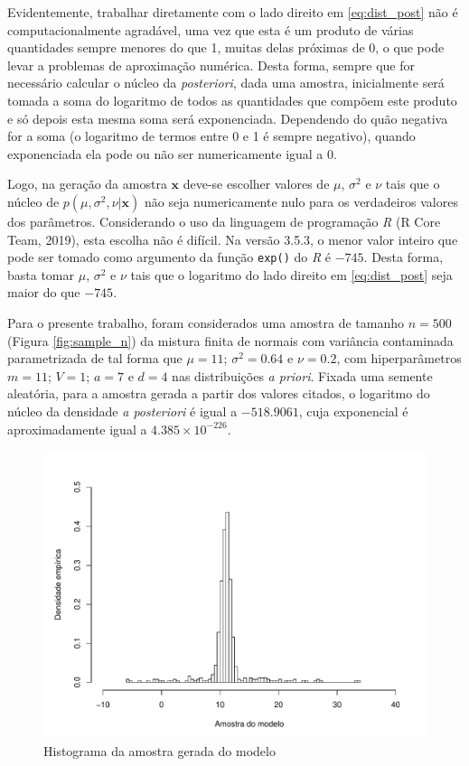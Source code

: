 Evidentemente, trabalhar diretamente com o lado direito em \eqref{eq:dist_post} não é computacionalmente agradável, uma vez que esta é um produto de várias quantidades sempre menores do que 1, muitas delas próximas de 0, o que pode levar a problemas de aproximação numérica. Desta forma, sempre que for necessário calcular o núcleo da \textit{posteriori}, dada uma amostra, inicialmente será tomada a soma do logaritmo de todos as quantidades que compõem este produto e só depois esta mesma soma será exponenciada. Dependendo do quão negativa for a soma (o logaritmo de termos entre 0 e 1 é sempre negativo), quando exponenciada ela pode ou não ser numericamente igual a 0.

Logo, na geração da amostra $\bm{x}$ deve-se escolher valores de $\mu$, $\sigma^2$ e $\nu$ tais que o núcleo de $p(\mu, \sigma^2, \nu | \bm{x})$ não seja numericamente nulo para os verdadeiros valores dos parâmetros. Considerando o uso da linguagem de programação \textit{R} (R Core Team, 2019)\cite{RCoreTeam2019}, esta escolha não é difícil. Na versão 3.5.3, o menor valor inteiro que pode ser tomado como argumento da função \verb|exp()| do \textit{R} é $-745$. Desta forma, basta tomar $\mu$, $\sigma^2$ e $\nu$ tais que o logaritmo do lado direito em \eqref{eq:dist_post} seja maior do que $-745$.

Para o presente trabalho, foram considerados uma amostra de tamanho $n=500$ (Figura \ref{fig:sample_n}) da mistura finita de normais com variância contaminada parametrizada de tal forma que $\mu = 11$; $\sigma^2 = 0.64$ e $\nu = 0.2$, com hiperparâmetros $m = 11$; $V = 1$; $a = 7$ e $d = 4$ nas distribuições \textit{a priori}. Fixada uma semente aleatória, para a amostra gerada a partir dos valores citados, o logaritmo do núcleo da densidade \textit{a posteriori} é igual a $-518.9061$, cuja exponencial é aproximadamente igual a $4.385 \times 10^{-226}$.

\begin{figure}[htb]
	\centering
	\includegraphics[scale=0.8]{figuras/amostra_n.pdf}
	\caption{Histograma da amostra gerada do modelo}
	\label{fig:sample_n.pdf}
\end{figure}

